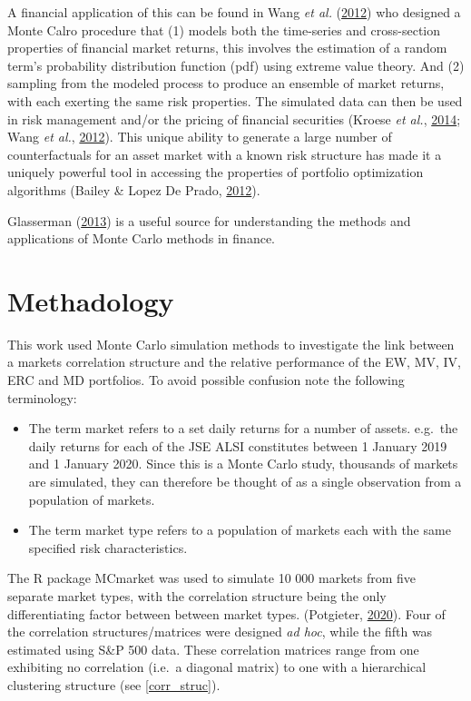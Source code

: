 \documentclass[11pt,preprint, authoryear]{elsarticle}
\numberwithin{equation}{section}
\numberwithin{figure}{section}
\numberwithin{table}{section}
\def\tightlist{} %
\begin{document}
A financial application of this can be found in Wang \emph{et al.}
(\protect\hyperlink{ref-wang2012}{2012}) who designed a Monte Calro
procedure that (1) models both the time-series and cross-section
properties of financial market returns, this involves the estimation of
a random term's probability distribution function (pdf) using extreme
value theory. And (2) sampling from the modeled process to produce an
ensemble of market returns, with each exerting the same risk properties.
The simulated data can then be used in risk management and/or the
pricing of financial securities (Kroese \emph{et al.},
\protect\hyperlink{ref-kroese2014}{2014}; Wang \emph{et al.},
\protect\hyperlink{ref-wang2012}{2012}). This unique ability to generate
a large number of counterfactuals for an asset market with a known risk
structure has made it a uniquely powerful tool in accessing the
properties of portfolio optimization algorithms (Bailey \& Lopez De
Prado, \protect\hyperlink{ref-lopez2012}{2012}).

Glasserman (\protect\hyperlink{ref-glasserman2013}{2013}) is a useful
source for understanding the methods and applications of Monte Carlo
methods in finance.

\hypertarget{methadology}{%
\section{\texorpdfstring{Methadology
\label{methadology}}{Methadology }}\label{methadology}}

This work used Monte Carlo simulation methods to investigate the link
between a markets correlation structure and the relative performance of
the EW, MV, IV, ERC and MD portfolios. To avoid possible confusion note
the following terminology:

\begin{itemize}
\tightlist
\item
  The term market refers to a set daily returns for a number of assets.
  e.g.~the daily returns for each of the JSE ALSI constitutes between 1
  January 2019 and 1 January 2020. Since this is a Monte Carlo study,
  thousands of markets are simulated, they can therefore be thought of
  as a single observation from a population of markets.
\item
  The term market type refers to a population of markets each with the
  same specified risk characteristics.
\end{itemize}

The R package MCmarket was used to simulate 10 000 markets from five
separate market types, with the correlation structure being the only
differentiating factor between between market types. (Potgieter,
\protect\hyperlink{ref-MCmarket}{2020}). Four of the correlation
structures/matrices were designed \emph{ad hoc}, while the fifth was
estimated using S\&P 500 data. These correlation matrices range from one
exhibiting no correlation (i.e.~a diagonal matrix) to one with a
hierarchical clustering structure (see \ref{corr_struc}).
\end{document}
